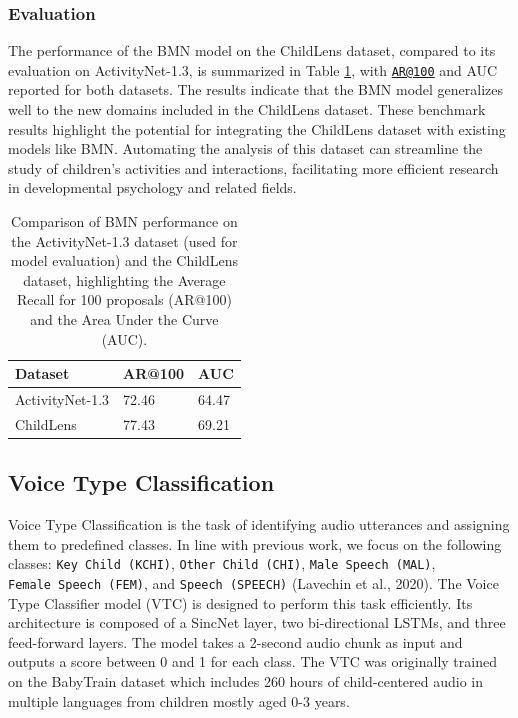 \documentclass[
  man,floatsintext]{apa6}
\begin{document}
\subsubsection{Evaluation}\label{evaluation}

The performance of the BMN model on the ChildLens dataset, compared to its evaluation on ActivityNet-1.3, is summarized in Table \ref{tab:bmn-results}, with \href{mailto:AR@100}{\nolinkurl{AR@100}} and AUC reported for both datasets. The results indicate that the BMN model generalizes well to the new domains included in the ChildLens dataset. These benchmark results highlight the potential for integrating the ChildLens dataset with existing models like BMN. Automating the analysis of this dataset can streamline the study of children's activities and interactions, facilitating more efficient research in developmental psychology and related fields.

\begin{table}[tbp]

\begin{center}
\begin{threeparttable}

\caption{\label{tab:bmn-results}Comparison of BMN performance on the ActivityNet-1.3 dataset (used for model evaluation) and the ChildLens dataset, highlighting the Average Recall for 100 proposals (AR@100) and the Area Under the Curve (AUC).}

\begin{tabular}{lll}
\toprule
Dataset & \multicolumn{1}{c}{AR@100} & \multicolumn{1}{c}{AUC}\\
\midrule
ActivityNet-1.3 & 72.46 & 64.47\\
ChildLens & 77.43 & 69.21\\
\bottomrule
\end{tabular}

\end{threeparttable}
\end{center}

\end{table}

\subsection{Voice Type Classification}\label{voice-type-classification}

Voice Type Classification is the task of identifying audio utterances and assigning them to predefined classes. In line with previous work, we focus on the following classes: \texttt{Key\ Child\ (KCHI)}, \texttt{Other\ Child\ (CHI)}, \texttt{Male\ Speech\ (MAL)}, \texttt{Female\ Speech\ (FEM)}, and \texttt{Speech\ (SPEECH)} (Lavechin et al., 2020). The Voice Type Classifier model (VTC) is designed to perform this task efficiently. Its architecture is composed of a SincNet layer, two bi-directional LSTMs, and three feed-forward layers. The model takes a 2-second audio chunk as input and outputs a score between 0 and 1 for each class. The VTC was originally trained on the BabyTrain dataset which includes 260 hours of child-centered audio in multiple languages from children mostly aged 0-3 years.
\end{document}
